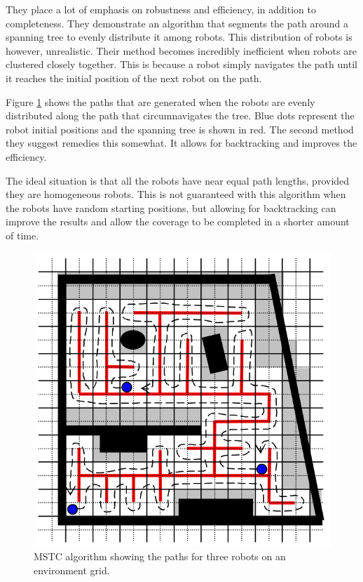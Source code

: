They place a lot of emphasis on robustness and efficiency, in addition to completeness. They demonstrate an algorithm that segments the path around a spanning tree to evenly distribute it among robots. This distribution of robots is however, unrealistic. Their method becomes incredibly inefficient when robots are clustered closely together. This is because a robot simply navigates the path until it reaches the initial position of the next robot on the path.

Figure \ref{fig:MSTC} shows the paths that are generated when the robots are evenly distributed along the path that circumnavigates the tree. Blue dots represent the robot initial positions and the spanning tree is shown in red. The second method they suggest remedies this somewhat. It allows for backtracking and improves the efficiency.

The ideal situation is that all the robots have near equal path lengths, provided they are homogeneous robots. This is not guaranteed with this algorithm when the robots have random starting positions, but allowing for backtracking can improve the results and allow the coverage to be completed in a shorter amount of time.
\begin{figure}[h!]
\centering
\includegraphics[scale=0.4]{figs/MSTC-Graphic}
\caption{MSTC algorithm showing the paths for three robots on an environment grid. \cite{Hazon2005}}
\label{fig:MSTC}
\end{figure}
